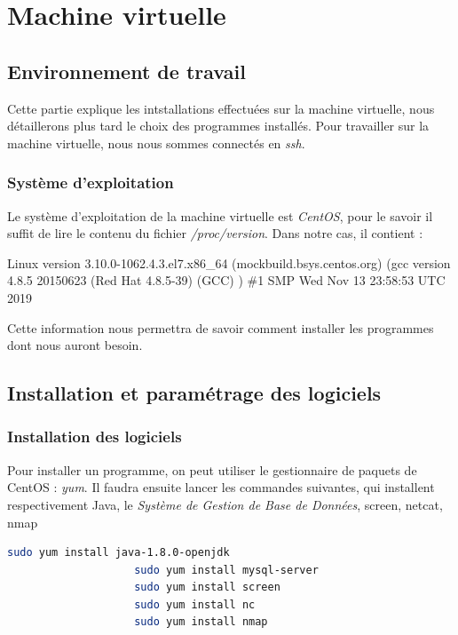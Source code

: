 \documentclass[a4paper, 12pt]{report}
\begin{document}
\section{Machine virtuelle}
	\subsection{Environnement de travail}
		Cette partie explique les intstallations effectuées sur la machine virtuelle, nous détaillerons plus tard le choix des programmes installés.
		Pour travailler sur la machine virtuelle, nous nous sommes connectés en \emph{ssh}.
		\subsubsection{Système d'exploitation}
			Le système d'exploitation de la machine virtuelle est \emph{CentOS}, pour le savoir il suffit de lire le contenu du fichier \emph{/proc/version}.
			Dans notre cas, il contient : 
			\begin{mdframed}[backgroundcolor=light-gray, roundcorner=20pt,
				leftmargin=0, rightmargin=0, 
				innerleftmargin=20, linecolor=darkgray]
				Linux version 3.10.0-1062.4.3.el7.x86\_64 (mockbuild\@kbuilder.bsys.centos.org) (gcc version 4.8.5 20150623 (Red Hat 4.8.5-39) (GCC) ) \#1 SMP Wed Nov 13 23:58:53 UTC 2019
			\end{mdframed}
			Cette information nous permettra de savoir comment installer les programmes dont nous auront besoin.
	\subsection{Installation et paramétrage des logiciels}
		\subsubsection{Installation des logiciels}
			Pour installer un programme, on peut utiliser le gestionnaire de paquets de CentOS : \emph{yum}.
			Il faudra ensuite lancer les commandes suivantes, qui installent respectivement Java, le \emph{Système de Gestion de Base de Données}, screen, netcat, nmap
			\begin{mdframed}[backgroundcolor=light-gray, roundcorner=20pt,
				leftmargin=0, rightmargin=0, 
				innerleftmargin=20, linecolor=darkgray]
				\begin{lstlisting}[language=bash]
					sudo yum install java-1.8.0-openjdk
					sudo yum install mysql-server
					sudo yum install screen
					sudo yum install nc
					sudo yum install nmap
				\end{lstlisting}
			\end{mdframed}
\end{document}
